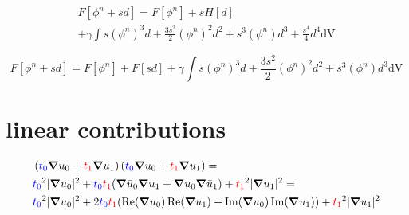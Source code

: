 \documentclass[12pt,a4paper]{article}
\newcommand{\RE}{\ensuremath{\operatorname{Re}}}
\newcommand{\IM}{\ensuremath{\operatorname{Im}}}
\newcommand{\Vext}{\ensuremath{\operatorname{V_{ext}}}}
\newcommand{\iu}{\ensuremath{\mathbbm{i}}}
\newcommand{\fz}{\ensuremath{{\color{blue}t_0}}}
\newcommand{\fo}{\ensuremath{{\color{red}t_1}}}
\newcommand{\dV}{\ensuremath{\mathrm{dV}}}
\begin{document}
\begin{multline}
F\left[\phi^n+sd\right] = F\left[\phi^n\right] + s H\left[d\right] \\ + \gamma\int s (\phi^n)^3 d + \frac{3 s^2}{2} (\phi^n)^2 d^2 + s^3 (\phi^n) d^3 + \frac{s^4}{4} d^4 \dV
\end{multline}

\begin{equation}
F\left[\phi^n+sd\right] = F\left[\phi^n\right] + F\left[sd\right] + \gamma\int s (\phi^n)^3 d + \frac{3 s^2}{2} (\phi^n)^2 d^2 + s^3 (\phi^n) d^3 \dV
\end{equation}








\section{linear contributions}

\begin{align}
&\left( \fz \grad \bar{u}_0 + \fo \grad \bar{u}_1 \right) \left( \fz \grad u_0 + \fo \grad u_1 \right) = \\
&\fz^2 \vert \grad u_0 \vert^2 + \fz \fo ( \grad \bar{u}_0 \grad u_1  + \grad u_0 \grad \bar{u}_1 ) + \fo^2 \vert \grad u_1 \vert^2 = \\
&\fz^2 \vert \grad u_0 \vert^2 + 2 \fz \fo ( \RE(\grad u_0) \RE(\grad u_1) + \IM(\grad u_0) \IM(\grad u_1) ) + \fo^2 \vert \grad u_1 \vert^2 
\end{align}
\end{document}
